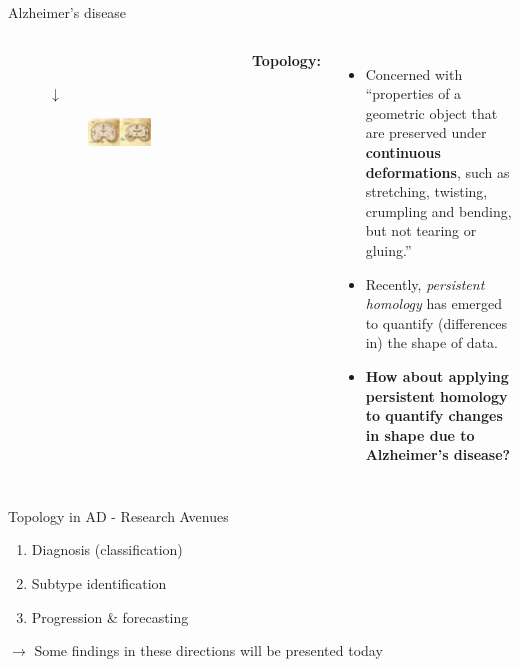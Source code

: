 \documentclass[aspectratio=169, 10pt, dvipsnames]{beamer}
\begin{document}
\begin{frame}[fragile]{Alzheimer's disease}
\begin{columns}[T,onlytextwidth]
\begin{figure}
\begin{subfigure}{0.2\textwidth}
      \end{subfigure}\\
      \centering
      $\downarrow$\\
      \begin{subfigure}{\textwidth}
        \centering
        \includegraphics[width=\textwidth]{figures/AD_brain_comparison.jpg}
      \end{subfigure}
    \end{figure}
    \textbf{Topology:} \doughnut \mug
    \begin{itemize}
    \item Concerned with ``properties of a geometric object that are preserved under \textbf{continuous deformations}, such as stretching, twisting, crumpling and bending, but not tearing or gluing.''
    \item Recently, \textit{persistent homology} has emerged to quantify (differences in) the shape of data.
    \item \textbf{How about applying persistent homology to quantify changes in shape due to Alzheimer's disease?}
    \end{itemize}
    \end{columns}
\end{frame}


\begin{frame}[fragile]{Topology in AD - Research Avenues \compass}
  \begin{enumerate}
  \item Diagnosis (classification)
  \item Subtype identification
  \item Progression \& forecasting
  \end{enumerate}
$\rightarrow$ Some findings in these directions will be presented today
\end{frame}
\end{document}
